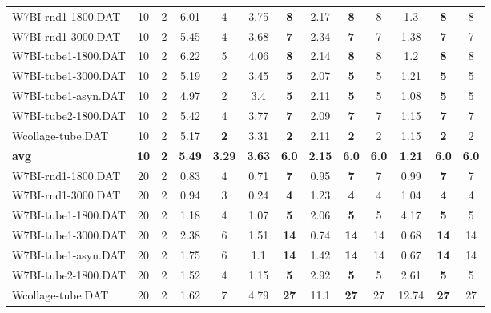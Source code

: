 \begin{table}[h]
{\begin{tabular}{lcccccccccccc}
W7BI-rnd1-1800.DAT & 10 & 2 & 6.01 & 4 & 3.75 &  \textbf{8} & 2.17 &  \textbf{8} & 8 &  \textcolor{blue2}{1.3} &  \textbf{8} & 8 \\
W7BI-rnd1-3000.DAT & 10 & 2 & 5.45 & 4 & 3.68 &  \textbf{7} & 2.34 &  \textbf{7} & 7 &  \textcolor{blue2}{1.38} &  \textbf{7} & 7 \\
W7BI-tube1-1800.DAT & 10 & 2 & 6.22 & 5 & 4.06 &  \textbf{8} & 2.14 &  \textbf{8} & 8 &  \textcolor{blue2}{1.2} &  \textbf{8} & 8 \\
W7BI-tube1-3000.DAT & 10 & 2 & 5.19 & 2 & 3.45 &  \textbf{5} & 2.07 &  \textbf{5} & 5 &  \textcolor{blue2}{1.21} &  \textbf{5} & 5 \\
W7BI-tube1-asyn.DAT & 10 & 2 & 4.97 & 2 & 3.4 &  \textbf{5} & 2.11 &  \textbf{5} & 5 &  \textcolor{blue2}{1.08} &  \textbf{5} & 5 \\
W7BI-tube2-1800.DAT & 10 & 2 & 5.42 & 4 & 3.77 &  \textbf{7} & 2.09 &  \textbf{7} & 7 &  \textcolor{blue2}{1.15} &  \textbf{7} & 7 \\
Wcollage-tube.DAT & 10 & 2 & 5.17 &  \textbf{2} & 3.31 &  \textbf{2} & 2.11 &  \textbf{2} & 2 &  \textcolor{blue2}{1.15} &  \textbf{2} & 2 \\
\cline{1-13} \textbf{avg} & \textbf{10} & \textbf{2} & \textbf{5.49} & \textbf{3.29} & \textbf{3.63} & \textbf{6.0} & \textbf{2.15} & \textbf{6.0} & \textbf{6.0} & \textbf{1.21} & \textbf{6.0} & \textbf{6.0} \\ \cline{1-13}
W7BI-rnd1-1800.DAT & 20 & 2 & 0.83 & 4 &  \textcolor{blue2}{0.71} &  \textbf{7} & 0.95 &  \textbf{7} & 7 & 0.99 &  \textbf{7} & 7 \\
W7BI-rnd1-3000.DAT & 20 & 2 & 0.94 & 3 &  \textcolor{blue2}{0.24} &  \textbf{4} & 1.23 &  \textbf{4} & 4 & 1.04 &  \textbf{4} & 4 \\
W7BI-tube1-1800.DAT & 20 & 2 & 1.18 & 4 &  \textcolor{blue2}{1.07} &  \textbf{5} & 2.06 &  \textbf{5} & 5 & 4.17 &  \textbf{5} & 5 \\
W7BI-tube1-3000.DAT & 20 & 2 & 2.38 & 6 & 1.51 &  \textbf{14} & 0.74 &  \textbf{14} & 14 &  \textcolor{blue2}{0.68} &  \textbf{14} & 14 \\
W7BI-tube1-asyn.DAT & 20 & 2 & 1.75 & 6 & 1.1 &  \textbf{14} & 1.42 &  \textbf{14} & 14 &  \textcolor{blue2}{0.67} &  \textbf{14} & 14 \\
W7BI-tube2-1800.DAT & 20 & 2 & 1.52 & 4 &  \textcolor{blue2}{1.15} &  \textbf{5} & 2.92 &  \textbf{5} & 5 & 2.61 &  \textbf{5} & 5 \\
Wcollage-tube.DAT & 20 & 2 &  \textcolor{blue2}{1.62} & 7 & 4.79 &  \textbf{27} & 11.1 &  \textbf{27} & 27 & 12.74 &  \textbf{27} & 27 \\

\end{tabular}}
\end{table}
